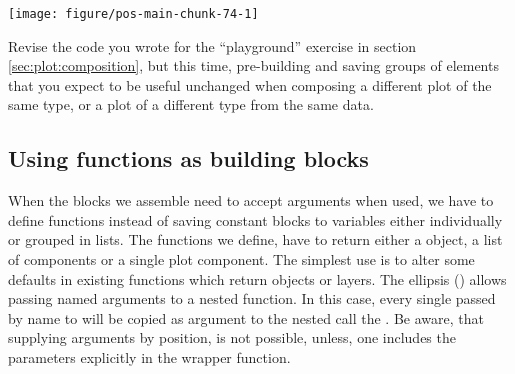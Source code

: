 \documentclass[krantz2]{krantz}\usepackage{knitr}%
\begin{document}
\begin{knitrout}\footnotesize
{}\color{fgcolor}\begin{kframe}
\begin{alltt}
 \hlkwb{<-}  \hlstd{(}\hlstd{))}
 \hlopt{+} 
\end{alltt}
\end{kframe}

{\centering \texttt{[image: figure/pos-main-chunk-74-1]} 

}



\end{knitrout}

\begin{playground}
Revise the code you wrote for the ``playground'' exercise in section \ref{sec:plot:composition}, but this time, pre-building and saving groups of elements that you expect to be useful unchanged when composing a different plot of the same type, or a plot of a different type from the same data.
\end{playground}


\subsection{Using functions as building blocks}

When the blocks we assemble need to accept arguments when used, we have to define functions instead of saving constant blocks to variables either individually or grouped in lists. The functions we define, have to return either a  object, a list of components or a single plot component. The simplest use is to alter some defaults in existing functions which return  objects or layers. The ellipsis () allows passing named arguments to a nested function. In this case, every single passed by name to  will be copied as argument to the nested call the . Be aware, that supplying arguments by position, is not possible, unless, one includes the parameters explicitly in the wrapper function.

\begin{knitrout}\footnotesize
{}\color{fgcolor}\begin{kframe}
\begin{alltt}
 \hlkwb{<-} \hlstd{(}\hlstd{) \{}
   \hlopt{+}
  \hlstd{()}
\hlstd{\}}
\end{alltt}
\end{kframe}
\end{knitrout}
\end{document}
